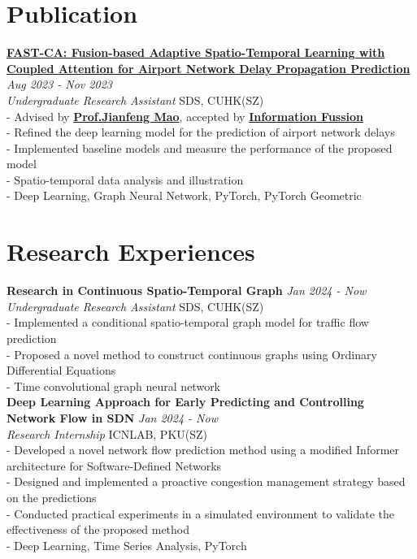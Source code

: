 \documentclass[a4paper,10pt]{article}
\begin{document}
\section*{Publication}
\textbf{\href{https://www.sciencedirect.com/science/article/pii/S1566253524001040}{FAST-CA: Fusion-based Adaptive Spatio-Temporal Learning with Coupled Attention for Airport Network Delay Propagation Prediction}} \hfill \textit{Aug 2023 - Nov 2023}\\
\textit{Undergraduate Research Assistant} \hfill SDS, CUHK(SZ)\\
- Advised by \textbf{\href{https://sds.cuhk.edu.cn/en/teacher/268}{Prof.\@ Jianfeng Mao}}, accepted by \textbf{\href{https://www.sciencedirect.com/science/article/pii/S1566253524001040}{Information Fussion}}\\
- Refined the deep learning model for the prediction of airport network delays\\
- Implemented baseline models and measure the performance of the proposed model\\
- Spatio-temporal data analysis and illustration\\
- Deep Learning, Graph Neural Network, PyTorch, PyTorch Geometric
\section*{Research Experiences}
\textbf{Research in Continuous Spatio-Temporal Graph} \hfill \textit{Jan 2024 - Now}\\
\textit{Undergraduate Research Assistant} \hfill SDS, CUHK(SZ)\\
- Implemented a conditional spatio-temporal graph model for traffic flow prediction\\
- Proposed a novel method to construct continuous graphs using Ordinary Differential Equations\\
- Time convolutional graph neural network\\
\textbf{Deep Learning Approach for Early Predicting and Controlling Network Flow in SDN} \hfill \textit{Jan 2024 - Now}\\
\textit{Research Internship} \hfill ICNLAB, PKU(SZ)\\
- Developed a novel network flow prediction method using a modified Informer architecture for Software-Defined Networks\\
- Designed and implemented a proactive congestion management strategy based on the predictions\\
- Conducted practical experiments in a simulated environment to validate the effectiveness of the proposed method\\
- Deep Learning, Time Series Analysis, PyTorch
\end{document}
